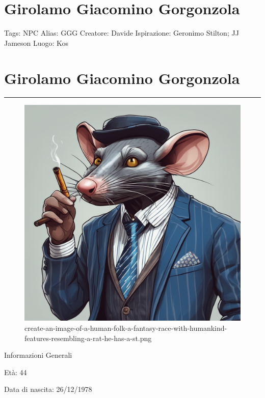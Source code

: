 \section{Girolamo Giacomino
Gorgonzola}\label{girolamo-giacomino-gorgonzola}

Tags: NPC Alias: GGG Creatore: Davide Ispirazione: Geronimo Stilton; JJ
Jameson Luogo: Kos

\section{Girolamo Giacomino
Gorgonzola}\label{girolamo-giacomino-gorgonzola-1}

\begin{center}\rule{0.5\linewidth}{0.5pt}\end{center}

\begin{figure}
\centering
\includegraphics{create-an-image-of-a-human-folk-a-fantasy-race-with-humankind-features-resembling-a-rat-he-has-a-st.png}
\caption{create-an-image-of-a-human-folk-a-fantasy-race-with-humankind-features-resembling-a-rat-he-has-a-st.png}
\end{figure}

Informazioni Generali

Età: 44

Data di nascita: 26/12/1978

